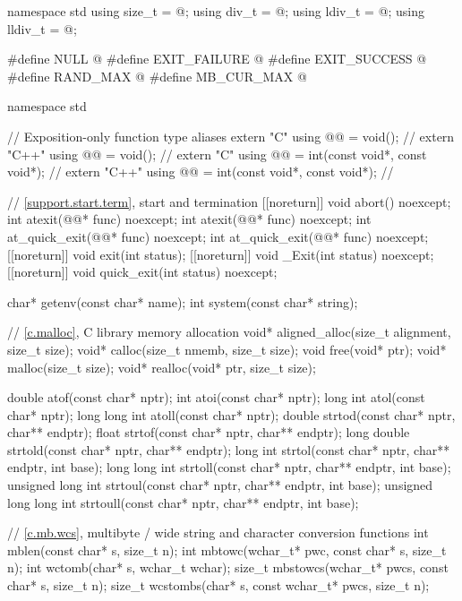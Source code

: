 \begin{codeblock}
namespace std {
  using size_t = @\seebelow@;
  using div_t = @\seebelow@;
  using ldiv_t = @\seebelow@;
  using lldiv_t = @\seebelow@;
}

#define NULL @\seebelow@
#define EXIT_FAILURE @\seebelow@
#define EXIT_SUCCESS @\seebelow@
#define RAND_MAX @\seebelow@
#define MB_CUR_MAX @\seebelow@

namespace std {
  // Exposition-only function type aliases
  extern "C" using @@ = void();                        // \expos
  extern "C++" using @@ = void();                        // \expos
  extern "C" using @@ = int(const void*, const void*);   // \expos
  extern "C++" using @@ = int(const void*, const void*);   // \expos

  // \ref{support.start.term}, start and termination
  [[noreturn]] void abort() noexcept;
  int atexit(@@* func) noexcept;
  int atexit(@@* func) noexcept;
  int at_quick_exit(@@* func) noexcept;
  int at_quick_exit(@@* func) noexcept;
  [[noreturn]] void exit(int status);
  [[noreturn]] void _Exit(int status) noexcept;
  [[noreturn]] void quick_exit(int status) noexcept;

  char* getenv(const char* name);
  int system(const char* string);

  // \ref{c.malloc}, C library memory allocation
  void* aligned_alloc(size_t alignment, size_t size);
  void* calloc(size_t nmemb, size_t size);
  void free(void* ptr);
  void* malloc(size_t size);
  void* realloc(void* ptr, size_t size);

  double atof(const char* nptr);
  int atoi(const char* nptr);
  long int atol(const char* nptr);
  long long int atoll(const char* nptr);
  double strtod(const char* nptr, char** endptr);
  float strtof(const char* nptr, char** endptr);
  long double strtold(const char* nptr, char** endptr);
  long int strtol(const char* nptr, char** endptr, int base);
  long long int strtoll(const char* nptr, char** endptr, int base);
  unsigned long int strtoul(const char* nptr, char** endptr, int base);
  unsigned long long int strtoull(const char* nptr, char** endptr, int base);

  // \ref{c.mb.wcs}, multibyte / wide string and character conversion functions
  int mblen(const char* s, size_t n);
  int mbtowc(wchar_t* pwc, const char* s, size_t n);
  int wctomb(char* s, wchar_t wchar);
  size_t mbstowcs(wchar_t* pwcs, const char* s, size_t n);
  size_t wcstombs(char* s, const wchar_t* pwcs, size_t n);

}
\end{codeblock}
